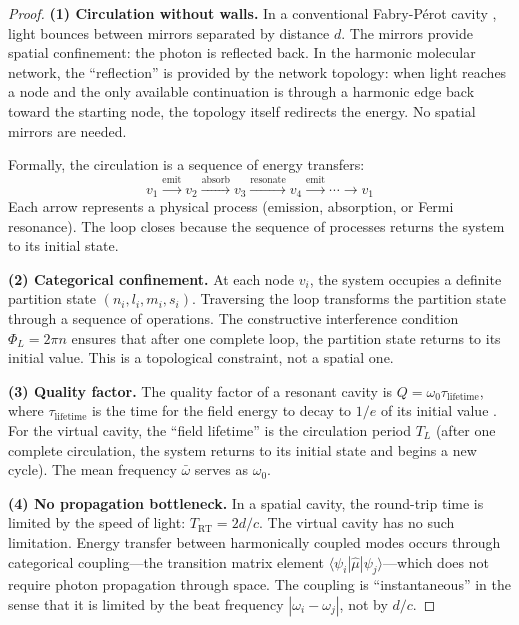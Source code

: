 \documentclass[11pt,twocolumn,a4paper]{article}
\theoremstyle{definition}
\theoremstyle{remark}
\begin{document}
\begin{proof}
\textbf{(1) Circulation without walls.} In a conventional Fabry-P\'{e}rot cavity \citep{fabry1899, siegman1986}, light bounces between mirrors separated by distance $d$. The mirrors provide spatial confinement: the photon is reflected back. In the harmonic molecular network, the ``reflection'' is provided by the network topology: when light reaches a node and the only available continuation is through a harmonic edge back toward the starting node, the topology itself redirects the energy. No spatial mirrors are needed.

Formally, the circulation is a sequence of energy transfers:
\begin{equation}
v_1 \xrightarrow{\text{emit}} v_2 \xrightarrow{\text{absorb}} v_3 \xrightarrow{\text{resonate}} v_4 \xrightarrow{\text{emit}} \cdots \xrightarrow{} v_1
\end{equation}
Each arrow represents a physical process (emission, absorption, or Fermi resonance). The loop closes because the sequence of processes returns the system to its initial state.

\textbf{(2) Categorical confinement.} At each node $v_i$, the system occupies a definite partition state $(n_i, l_i, m_i, s_i)$. Traversing the loop transforms the partition state through a sequence of operations. The constructive interference condition $\Phi_L = 2\pi n$ ensures that after one complete loop, the partition state returns to its initial value. This is a topological constraint, not a spatial one.

\textbf{(3) Quality factor.} The quality factor of a resonant cavity is $Q = \omega_0 \tau_{\mathrm{lifetime}}$, where $\tau_{\mathrm{lifetime}}$ is the time for the field energy to decay to $1/e$ of its initial value \citep{siegman1986, vahala2003}. For the virtual cavity, the ``field lifetime'' is the circulation period $T_L$ (after one complete circulation, the system returns to its initial state and begins a new cycle). The mean frequency $\bar{\omega}$ serves as $\omega_0$.

\textbf{(4) No propagation bottleneck.} In a spatial cavity, the round-trip time is limited by the speed of light: $T_{\mathrm{RT}} = 2d/c$. The virtual cavity has no such limitation. Energy transfer between harmonically coupled modes occurs through categorical coupling---the transition matrix element $\langle \psi_i | \hat{\mu} | \psi_j \rangle$---which does not require photon propagation through space. The coupling is ``instantaneous'' in the sense that it is limited by the beat frequency $|\omega_i - \omega_j|$, not by $d/c$.
\end{proof}
\end{document}
